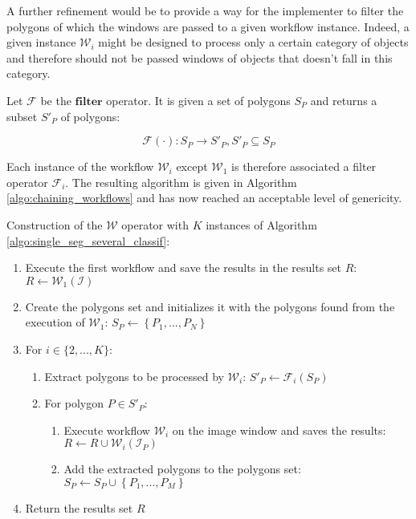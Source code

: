 A further refinement would be to provide a way for the implementer to filter the polygons of which the windows are passed to a given workflow instance. Indeed, a given instance $\mathcal{W}_i$ might be designed to process only a certain category of objects and therefore should not be passed windows of objects that doesn't fall in this category. 

\begin{definition}\label{def:filter_op}
	Let $\mathcal{F}$ be the $\textbf{filter}$ operator. It is given a set of polygons $S_P$ and returns a subset $S'_P$ of polygons:
	
	\begin{equation}
		\mathcal{F}(\cdot): S_P \rightarrow S'_P, S'_P \subseteq S_P
	\end{equation}
\end{definition}

Each instance of the workflow $\mathcal{W}_i$ except $\mathcal{W}_1$ is therefore associated a filter operator $\mathcal{F}_i$. The resulting algorithm is given in Algorithm \ref{algo:chaining_workflows} and has now reached an acceptable level of genericity.

\begin{algorithm} \label{algo:chaining_workflows}
	Construction of the $\mathcal{W}$ operator with $K$ instances of Algorithm \ref{algo:single_seg_several_classif}:

	\begin{enumerate}
		\item Execute the first workflow and save the results in the results set $R$: $R \leftarrow \mathcal{W}_1(\mathcal{I})$
		\item Create the polygons set and initializes it with the polygons found from the execution of $\mathcal{W}_1$: $S_P \leftarrow \left\{P_1, ..., P_N\right\}$
		\item For $i \in \{2, ..., K\}$:
		\begin{enumerate}
			\item Extract polygons to be processed by $\mathcal{W}_i$: $S'_P \leftarrow \mathcal{F}_i(S_P)$
			\item For polygon $P \in S'_P$:
			\begin{enumerate}
				\item Execute workflow $\mathcal{W}_i$ on the image window and saves the results: $R \leftarrow R \cup \mathcal{W}_i(\mathcal{I}_P)$
				\item Add the extracted polygons to the polygons set: $S_P \leftarrow S_P \cup \left\{P_1, ..., P_M\right\}$
			\end{enumerate}
		\end{enumerate}
		\item Return the results set $R$
	\end{enumerate}
\end{algorithm}

